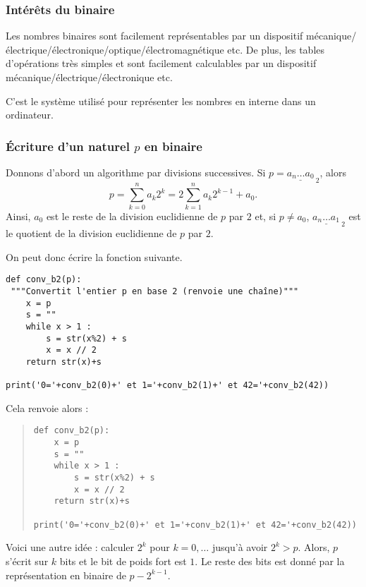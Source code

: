 \subsubsection{Intérêts du binaire}
Les nombres binaires sont facilement représentables par un dispositif
  mécanique/électrique/électronique/optique/électromagnétique etc.
De plus, les tables d'opérations très simples et sont facilement calculables par un
  dispositif mécanique/électrique/électronique etc.

C'est le système utilisé pour représenter les nombres en interne dans
un ordinateur.

\subsubsection{Écriture d'un naturel $p$ en binaire}

Donnons d'abord un algorithme par divisions successives.
Si $p = \underline{a_n\dots a_0}_{~2}$, alors 
$$ p = \sum_{k=0}^n a_k 2^k = 2\sum_{k=1}^n a_k2^{k-1} + a_0.$$
Ainsi, $a_0$ est le reste de la division euclidienne de $p$ par $2$ et, si $p\neq a_0$, $\underline{a_n\dots a_1}_{~2}$ est le quotient de la division euclidienne de $p$ par $2$.

On peut donc écrire la fonction suivante.



\begin{lstlisting}
def conv_b2(p):
 """Convertit l'entier p en base 2 (renvoie une chaîne)"""
    x = p
    s = ""
    while x > 1 :
        s = str(x%2) + s
        x = x // 2
    return str(x)+s

print('0='+conv_b2(0)+' et 1='+conv_b2(1)+' et 42='+conv_b2(42))
\end{lstlisting}



Cela renvoie alors :
\begin{quote}
\begin{lstlisting}
def conv_b2(p):
    x = p
    s = ""
    while x > 1 :
        s = str(x%2) + s
        x = x // 2
    return str(x)+s

print('0='+conv_b2(0)+' et 1='+conv_b2(1)+' et 42='+conv_b2(42))
\end{lstlisting}
\end{quote}


Voici une autre idée : calculer $2^{k}$ pour $k=0, \ldots$ jusqu'à avoir $2^{k} >
  p$. Alors, $p$ s'écrit sur $k$ bits et le bit de poids fort est
  $1$. Le reste des bits est donné par la représentation en binaire de
  $p-2^{k-1}$.


